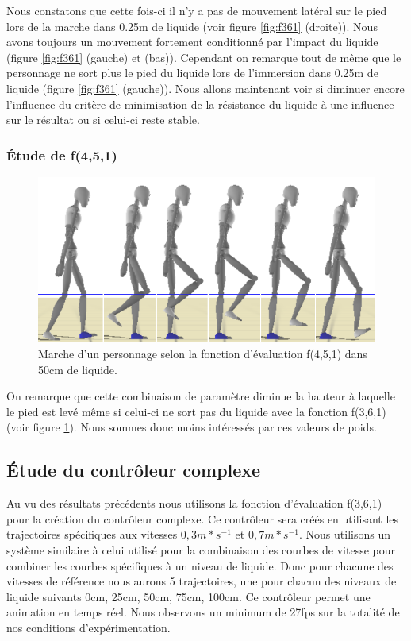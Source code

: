 \documentclass[runningheads,a4paper]{llncs}
\begin{document}
Nous constatons que cette fois-ci il n'y a pas de mouvement latéral sur le pied lors de la marche dans 0.25m de liquide (voir figure \ref{fig:f361} (droite)). Nous avons toujours un mouvement fortement conditionné par l'impact du liquide (figure \ref{fig:f361} (gauche) et (bas)). Cependant on remarque tout de même que le personnage ne sort plus le pied du liquide lors de l'immersion dans 0.25m de liquide (figure \ref{fig:f361} (gauche)). Nous allons maintenant voir si diminuer encore l'influence du critère de minimisation de la résistance du liquide à une influence sur le résultat ou si celui-ci reste stable.

\subsubsection{Étude de f(4,5,1)}


\vspace*{-0.85cm}
\begin{figure}[h]
\centering
\includegraphics[scale=0.4]{strips/4_5_1_50cm.png}
\caption{Marche d'un personnage selon la fonction d'évaluation f(4,5,1) dans 50cm de liquide.}
\label{fig:f451}
\end{figure}

On remarque que cette combinaison de paramètre diminue la hauteur à laquelle le pied est levé même si celui-ci ne sort pas du liquide avec la fonction f(3,6,1) (voir figure \ref{fig:f451}). Nous sommes donc moins intéressés par ces valeurs de poids. 

\subsection{Étude du contrôleur complexe}

Au vu des résultats précédents nous utilisons la fonction d'évaluation f(3,6,1) pour la création du contrôleur complexe. Ce contrôleur sera créés en utilisant les trajectoires spécifiques aux vitesses $0,3m*s^{-1}$ et $0,7m*s^{-1}$. Nous utilisons un système similaire à celui utilisé pour la combinaison des courbes de vitesse pour combiner les courbes spécifiques à un niveau de liquide. Donc pour chacune des vitesses de référence nous aurons 5 trajectoires, une pour chacun des niveaux de liquide suivants 0cm, 25cm, 50cm, 75cm, 100cm. Ce contrôleur permet une animation en temps réel. Nous observons un minimum de 27fps sur la totalité de nos conditions d'expérimentation.
\end{document}
